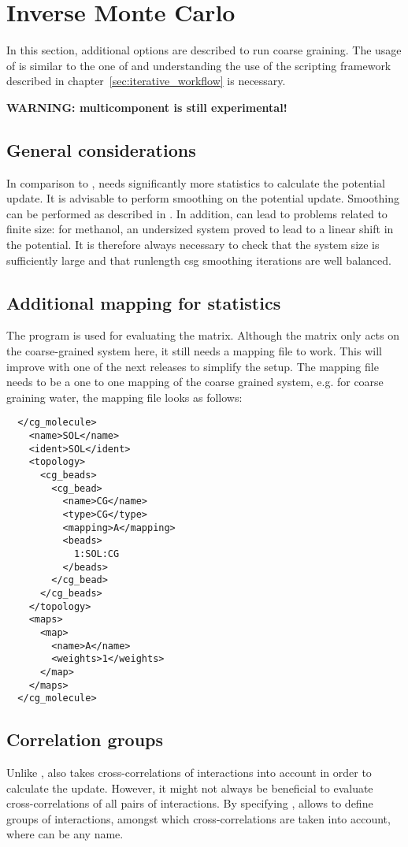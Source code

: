 \section{Inverse Monte Carlo}
\label{sec:iterative_methods_imc}
In this section, additional options are described to run \imc coarse graining. The usage of \imc is similar to the one of \ibi and understanding the use of the scripting framework described in chapter~\ref{sec:iterative_workflow} is necessary.

\textbf{WARNING: multicomponent \imc is still experimental!}

\subsection{General considerations}
In comparison to \ibi, \imc needs significantly more statistics to calculate the potential update\cite{Ruehle:2009.a}. It is advisable to perform smoothing on the potential update. Smoothing can be performed as described in . In addition, \imc can lead to problems related to finite size: for methanol, an undersized system proved to lead to a linear shift in the potential\cite{Ruehle:2009.a}. It is therefore always necessary to check that the system size is sufficiently large and that runlength csg smoothing iterations are well balanced.

\subsection{Additional mapping for statistics}
The program  is used for evaluating the \imc matrix. Although the matrix only acts on the coarse-grained system here, it still needs a mapping file to work. This will improve with one of the next releases to simplify the setup. The mapping file needs to be a one to one mapping of the coarse grained system, e.g. for coarse graining \spce water, the mapping file looks as follows:
\begin{lstlisting}
  </cg_molecule>
    <name>SOL</name> 
    <ident>SOL</ident>
    <topology>
      <cg_beads>
        <cg_bead>
          <name>CG</name>
          <type>CG</type>
          <mapping>A</mapping>
          <beads>
            1:SOL:CG 
          </beads>
        </cg_bead>
      </cg_beads>
    </topology>
    <maps>
      <map>
        <name>A</name>
        <weights>1</weights>
      </map>
    </maps>
  </cg_molecule>
\end{lstlisting}

\subsection{Correlation groups}
Unlike \ibi, \imc also takes cross-correlations of interactions into account in order to calculate the update. However, it might not always be beneficial to evaluate cross-correlations of all pairs of interactions. By specifying , \votca allows to define groups of interactions, amongst which cross-correlations are taken into account, where  can be any name.

